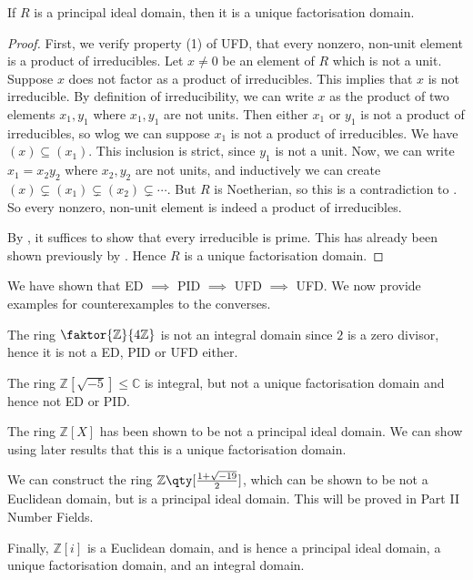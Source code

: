 \begin{theorem} \label{thm:10.8}
	If $R$ is a principal ideal domain, then it is a unique factorisation domain.
\end{theorem}

\begin{proof}
	First, we verify property (1) of UFD, that every nonzero, non-unit element is a product of irreducibles.
	Let $x \neq 0$ be an element of $R$ which is not a unit.
	Suppose $x$ does not factor as a product of irreducibles.
	This implies that $x$ is not irreducible.
	By definition of irreducibility, we can write $x$ as the product of two elements $x_1, y_1$ where $x_1, y_1$ are not units.
	Then either $x_1$ or $y_1$ is not a product of irreducibles, so wlog we can suppose $x_1$ is not a product of irreducibles.
	We have $(x) \subseteq (x_1)$.
	This inclusion is strict, since $y_1$ is not a unit.
	Now, we can write $x_1 = x_2 y_2$ where $x_2, y_2$ are not units, and inductively we can create $(x) \subsetneq (x_1) \subsetneq (x_2) \subsetneq \cdots$.
	But $R$ is Noetherian, so this is a contradiction to .
	So every nonzero, non-unit element is indeed a product of irreducibles.

	By , it suffices to show that every irreducible is prime.
	This has already been shown previously by .
	Hence $R$ is a unique factorisation domain.
\end{proof}

\begin{example}
	We have shown that ED $\implies$ PID $\implies$ UFD $\implies$ UFD.
	We now provide examples for counterexamples to the converses.

	The ring $\faktor{\mathbb Z}{4\mathbb Z}$ is not an integral domain since $2$ is a zero divisor, hence it is not a ED, PID or UFD either.

	The ring $\mathbb Z[\sqrt{-5}] \leq \mathbb C$ is integral, but not a unique factorisation domain and hence not ED or PID.

	The ring $\mathbb Z[X]$ has been shown to be not a principal ideal domain.
	We can show using later results that this is a unique factorisation domain.

	We can construct the ring $\mathbb Z\qty[\frac{1+\sqrt{-19}}{2}]$, which can be shown to be not a Euclidean domain, but is a principal ideal domain.
	This will be proved in Part II Number Fields.

	Finally, $\mathbb Z[i]$ is a Euclidean domain, and is hence a principal ideal domain, a unique factorisation domain, and an integral domain.
\end{example}

